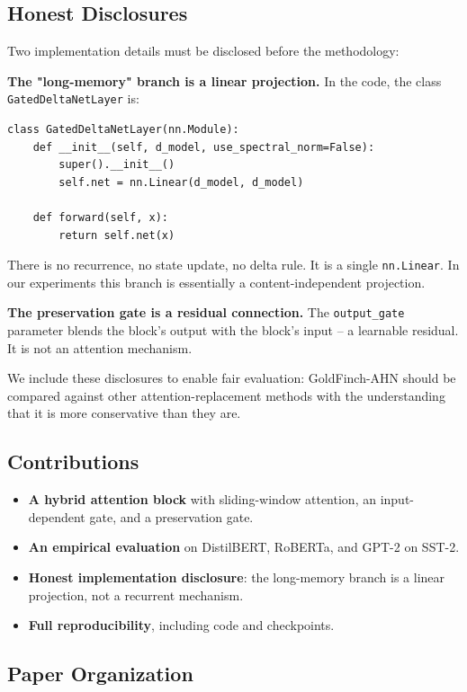 \subsection{Honest Disclosures}

Two implementation details must be disclosed before the methodology:

\textbf{The "long-memory" branch is a linear projection.} In the code, the class 
\texttt{GatedDeltaNetLayer} is:

\begin{lstlisting}
class GatedDeltaNetLayer(nn.Module):
    def __init__(self, d_model, use_spectral_norm=False):
        super().__init__()
        self.net = nn.Linear(d_model, d_model)

    def forward(self, x):
        return self.net(x)
\end{lstlisting}

There is no recurrence, no state update, no delta rule. It is a single 
\texttt{nn.Linear}. In our experiments this branch is essentially a 
content-independent projection.

\textbf{The preservation gate is a residual connection.} The \texttt{output\_gate} 
parameter blends the block's output with the block's input -- a learnable 
residual. It is not an attention mechanism.

We include these disclosures to enable fair evaluation: GoldFinch-AHN 
should be compared against other attention-replacement methods with the 
understanding that it is more conservative than they are.

\subsection{Contributions}

\begin{itemize}
\item \textbf{A hybrid attention block} with sliding-window attention, an input-dependent
  gate, and a preservation gate.
\item \textbf{An empirical evaluation} on DistilBERT, RoBERTa, and GPT-2 on SST-2.
\item \textbf{Honest implementation disclosure}: the long-memory branch is a linear
  projection, not a recurrent mechanism.
\item \textbf{Full reproducibility}, including code and checkpoints.

\end{itemize}
\subsection{Paper Organization}

